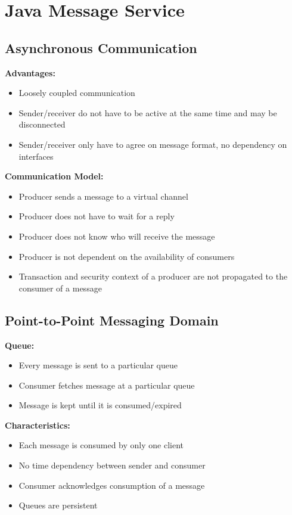 \documentclass[10pt]{article}
\begin{document}
\newpage
\section{Java Message Service}
\subsection{Asynchronous Communication}
\textbf{Advantages:}
\begin{itemize}
	\item Loosely coupled communication
	\item Sender/receiver do not have to be active at the same time and may be disconnected
	\item Sender/receiver only have to agree on message format, no dependency on interfaces
\end{itemize}
\textbf{Communication Model:}
\begin{itemize}
	\item Producer sends a message to a virtual channel
	\item Producer does not have to wait for a reply
	\item Producer does not know who will receive the message
	\item Producer is not dependent on the availability of consumers
	\item Transaction and security context of a producer are not propagated to the consumer of a message
\end{itemize}
\subsection{Point-to-Point Messaging Domain}
\textbf{Queue:}
\begin{itemize}
	\item Every message is sent to a particular queue
	\item Consumer fetches message at a particular queue
	\item Message is kept until it is consumed/expired
\end{itemize}
\textbf{Characteristics:}
\begin{itemize}
	\item Each message is consumed by only one client
	\item No time dependency between sender and consumer
	\item Consumer acknowledges consumption of a message
	\item Queues are persistent
\end{itemize}
\end{document}
